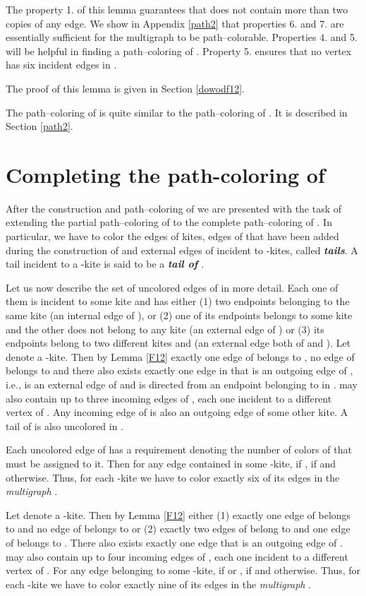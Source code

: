\documentclass[a4, 11pt]{article}
\newcommand{\<}{\langle}
\renewcommand{\>}{\rangle}
\begin{document}
The property 1. of this lemma guarantees that  does not contain more than two copies of any edge. We  show in Appendix \ref{path2} that properties 6. and 7. are essentially sufficient for the multigraph  to be path--colorable. Properties  4. and 5. will be helpful
in finding a path--coloring of . Property 5. ensures that no vertex  has six incident edges in . 

The proof of this lemma is given in Section \ref{dowodf12}.

The path--coloring of  is quite similar to the path--coloring of . It is described in Section \ref{path2}.

\section{Completing the path-coloring of }
After the construction and path--coloring of  we are presented with the task of extending the partial path--coloring of  to the complete path--coloring of . In particular, we have to color the  edges
of kites, edges of  that have been added during the construction of  and external edges of  incident to -kites, called {\bf \em tails}. A tail incident to a -kite  is said to be a {\bf \em tail of }.

Let us now describe the set of uncolored edges of  in more detail. Each one of them is incident to some kite and has either (1) two endpoints belonging to the same kite  (an internal edge of ), or (2) one of its endpoints belongs to some kite  and the other does not belong to any kite (an external edge of ) or (3) its endpoints belong to two different kites  and  (an external edge both of  and ). Let  denote a -kite. Then by Lemma \ref{F12} exactly one edge  of  belongs to , no edge of  belongs to  and there also exists  exactly one edge in   that is an outgoing edge of , i.e.,  is an external edge of  and is directed from an endpoint belonging to  in .
 may also contain up to three incoming edges of , each one incident to a different vertex of .  Any incoming edge of  is also an outgoing edge of some other kite. A tail of  is also uncolored in . 

Each uncolored edge  of  has a requirement  denoting the number of colors of  that must be assigned to it. 
 Then for any edge  contained in some -kite,  if  ,  if  and  otherwise. Thus, for each -kite  we have to color exactly six of its edges in the {\em multigraph} .

Let  denote a -kite. Then by Lemma \ref{F12} either (1) exactly one edge  of  belongs to  and no edge of  belongs to  or (2) exactly two edges of  belong to  and one edge of  belongs to . There also exists  exactly one edge   that is an outgoing edge of .  may also contain up to four incoming edges of , each one incident to a different vertex of . For any edge  belonging to some -kite,  if  or ,  if  and  otherwise.  Thus, for each -kite  we have to color exactly nine of its edges in the {\em multigraph} .
\end{document}
